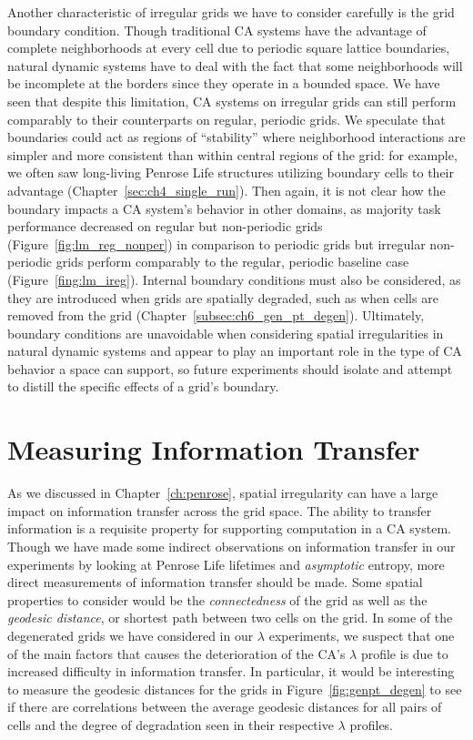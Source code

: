 \documentclass[a4paper,11pt,twoside]{report}
\begin{document}
Another characteristic of irregular grids we have to consider carefully is the grid boundary condition. Though traditional CA systems have the advantage of complete neighborhoods at every cell due to periodic square lattice boundaries, natural dynamic systems have to deal with the fact that some neighborhoods will be incomplete at the borders since they operate in a bounded space. We have seen that despite this limitation, CA systems on irregular grids can still perform comparably to their counterparts on regular, periodic grids.  We speculate that boundaries could act as regions of ``stability'' where neighborhood interactions are simpler and more consistent than within central regions of the grid: for example, we often saw long-living Penrose Life structures utilizing boundary cells to their advantage (Chapter~\ref{sec:ch4_single_run}). Then again, it is not clear how the boundary impacts a CA system's behavior in other domains, as majority task performance decreased on regular but non-periodic grids (Figure~\ref{fig:lm_reg_nonper}) in comparison to periodic grids but irregular non-periodic grids perform comparably to the regular, periodic baseline case (Figure~\ref{fing:lm_ireg}). Internal boundary conditions must also be considered, as they are introduced when grids are spatially degraded, such as when cells are removed from the grid (Chapter~\ref{subsec:ch6_gen_pt_degen}). Ultimately, boundary conditions are unavoidable when considering spatial irregularities in natural dynamic systems and appear to play an important role in the type of CA behavior a space can support, so future experiments should isolate and attempt to distill the specific effects of a grid's boundary.



\section{Measuring Information Transfer}
As we discussed in Chapter~\ref{ch:penrose}, spatial irregularity can have a large impact on information transfer across the grid space. The ability to transfer information is a requisite property for supporting computation in a CA system. Though we have made some indirect observations on information transfer in our experiments by looking at Penrose Life lifetimes and \textit{asymptotic} entropy, more direct measurements of information transfer should be made. Some spatial properties to consider would be the \textit{connectedness} of the grid as well as the \textit{geodesic distance}, or shortest path between two cells on the grid. In some of the degenerated grids we have considered in our $\lambda$ experiments, we suspect that one of the main factors that causes the deterioration of the CA's $\lambda$ profile is due to increased difficulty in information transfer. In particular, it would be interesting to measure the geodesic distances for the grids in Figure~\ref{fig:genpt_degen} to see if there are correlations between the average geodesic distances for all pairs of cells and the degree of degradation seen in their respective $\lambda$ profiles.
\end{document}
